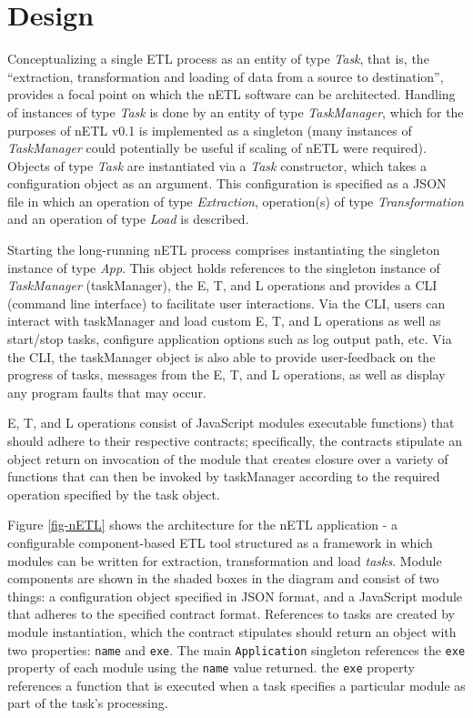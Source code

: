 \section{Design}
Conceptualizing a single ETL process as an entity of type \textit{Task}, that is, the ``extraction, transformation and loading of data from a source to destination'', provides a focal point on which the nETL software can be architected. Handling of instances of type \textit{Task} is done by an entity of type \textit{TaskManager}, which for the purposes of nETL v0.1 is implemented as a singleton (many instances of \textit{TaskManager} could potentially be useful if scaling of nETL were required). Objects of type \textit{Task} are instantiated via a \textit{Task} constructor, which takes a configuration object as an argument. This configuration is specified as a JSON file in which an operation of type \textit{Extraction}, operation(s) of type \textit{Transformation} and an operation of type \textit{Load} is described.

Starting the long-running nETL process comprises instantiating the singleton instance of type \textit{App}. This object holds references to the singleton instance of \textit{TaskManager} (taskManager), the E, T, and L operations and provides a CLI (command line interface) to facilitate user interactions. Via the CLI, users can interact with taskManager and load custom E, T, and L operations as well as start/stop tasks, configure application options such as log output path, etc. Via the CLI, the taskManager object is also able to provide user-feedback on the progress of tasks, messages from the E, T, and L operations, as well as display any program faults that may occur.

E, T, and L operations consist of JavaScript modules executable functions) that should adhere to their respective contracts; specifically, the contracts stipulate an object return on invocation of the module that creates closure over a variety of functions that can then be invoked by taskManager according to the required operation specified by the task object.


Figure \ref{fig-nETL} shows the architecture for the nETL application - a configurable component-based ETL tool structured as a framework in which modules can be written for extraction, transformation and load \textit{tasks}. Module components are shown in the shaded boxes in the diagram and consist of two things: a configuration object specified in JSON format, and a JavaScript module that adheres to the specified contract format. References to tasks are created by module instantiation, which the contract stipulates should return an object with two properties: \texttt{name} and \texttt{exe}. The main \texttt{Application} singleton references the \texttt{exe} property of each module using the \texttt{name} value returned. the \texttt{exe} property references a function that is executed when a task specifies a particular module as part of the task's processing.

